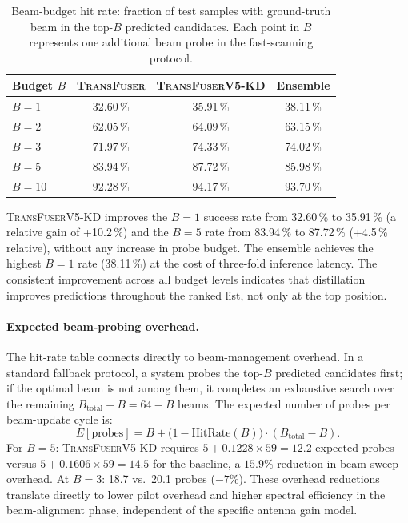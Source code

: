 \documentclass[journal,10pt,twoside]{IEEEtran}
\newcommand{\distill}{\textsc{TransFuserV5-KD}}
\newcommand{\baseline}{\textsc{TransFuser}}
\begin{document}
\begin{table}[t]
\centering
\caption{%
  Beam-budget hit rate: fraction of test samples with ground-truth beam
  in the top-$B$ predicted candidates. Each point in $B$ represents one
  additional beam probe in the fast-scanning protocol.%
}
\label{tab:beam_budget}
\renewcommand{\arraystretch}{1.15}
\begin{tabular}{lccc}
\toprule
\textbf{Budget $B$} & \textbf{\baseline{}} & \textbf{\distill{}} & \textbf{Ensemble} \\
\midrule
$B=1$  & 32.60\,\% & 35.91\,\% & 38.11\,\% \\
$B=2$  & 62.05\,\% & 64.09\,\% & 63.15\,\% \\
$B=3$  & 71.97\,\% & 74.33\,\% & 74.02\,\% \\
$B=5$  & 83.94\,\% & 87.72\,\% & 85.98\,\% \\
$B=10$ & 92.28\,\% & 94.17\,\% & 93.70\,\% \\
\bottomrule
\end{tabular}
\end{table}

\distill{} improves the $B=1$ success rate from 32.60\,\% to 35.91\,\%
(a relative gain of +10.2\,\%) and the $B=5$ rate from 83.94\,\% to
87.72\,\% (+4.5\,\% relative), without any increase in probe budget.
The ensemble achieves the highest $B=1$ rate (38.11\,\%) at the cost of
three-fold inference latency. The consistent improvement across all budget
levels indicates that distillation improves predictions throughout the
ranked list, not only at the top position.

\paragraph{Expected beam-probing overhead.}
The hit-rate table connects directly to beam-management overhead.
In a standard fallback protocol, a system probes the top-$B$ predicted
candidates first; if the optimal beam is not among them, it completes an
exhaustive search over the remaining $B_{\mathrm{total}} - B = 64 - B$ beams.
The expected number of probes per beam-update cycle is:
\begin{equation}
  E[\text{probes}] = B + \bigl(1 - \mathrm{HitRate}(B)\bigr)\cdot(B_{\mathrm{total}} - B).
  \label{eq:eprobes}
\end{equation}
For $B=5$: \distill{} requires $5 + 0.1228 \times 59 = 12.2$ expected probes
versus $5 + 0.1606 \times 59 = 14.5$ for the baseline, a $\mathbf{15.9\%}$
reduction in beam-sweep overhead. At $B=3$: 18.7 vs.\ 20.1 probes ($-7\%$).
These overhead reductions translate directly to lower pilot overhead and higher
spectral efficiency in the beam-alignment phase, independent of the specific
antenna gain model.
\end{document}
